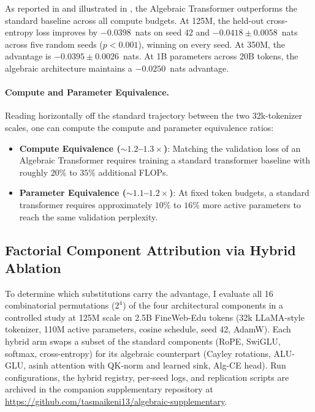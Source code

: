 \documentclass[11pt,a4paper]{article}
\theoremstyle{definition}
\begin{document}
As reported in  and illustrated in , the Algebraic Transformer outperforms the standard baseline across all compute budgets. At 125M, the held-out cross-entropy loss improves by $-0.0398$~nats on seed 42 and $-0.0418 \pm 0.0058$~nats across five random seeds ($p < 0.001$), winning on every seed. At 350M, the advantage is $-0.0395 \pm 0.0026$~nats. At 1B parameters across 20B tokens, the algebraic architecture maintains a $-0.0250$~nats advantage.

\paragraph{Compute and Parameter Equivalence.}
Reading horizontally off the standard trajectory between the two 32k-tokenizer scales, one can compute the compute and parameter equivalence ratios:
\begin{itemize}
    \item \textbf{Compute Equivalence ($\sim 1.2$--$1.3\times$)}: Matching the validation loss of an Algebraic Transformer requires training a standard transformer baseline with roughly $20\%$ to $35\%$ additional FLOPs.
    \item \textbf{Parameter Equivalence ($\sim 1.1$--$1.2\times$)}: At fixed token budgets, a standard transformer requires approximately $10\%$ to $16\%$ more active parameters to reach the same validation perplexity.
\end{itemize}

\subsection{Factorial Component Attribution via Hybrid Ablation}
\label{subsec:hybrid}

To determine which substitutions carry the advantage, I evaluate all 16 combinatorial permutations ($2^4$) of the four architectural components in a controlled study at 125M scale on 2.5B FineWeb-Edu tokens (32k LLaMA-style tokenizer, 110M active parameters, cosine schedule, seed 42, AdamW). Each hybrid arm swaps a subset of the standard components (RoPE, SwiGLU, softmax, cross-entropy) for its algebraic counterpart (Cayley rotations, ALU-GLU, asinh attention with QK-norm and learned sink, Alg-CE head). Run configurations, the hybrid registry, per-seed logs, and replication scripts are archived in the companion supplementary repository at \url{https://github.com/tasmaikeni13/algebraic-supplementary}.
\end{document}
